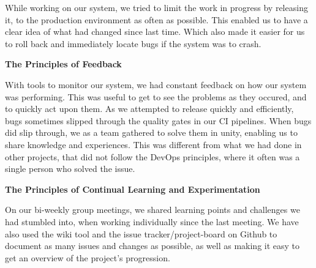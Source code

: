 While working on our system, we tried to limit the work in progress by releasing it, to the production environment as often as possible. 
This enabled us to have a clear idea of what had changed since last time. 
Which also made it easier for us to roll back and immediately locate bugs if the system was to crash.

\textbf{The Principles of Feedback}

With tools to monitor our system, we had constant feedback on how our system was performing. 
This was useful to get to see the problems as they occured, and to quickly act upon them. 
As we attempted to release quickly and efficiently, bugs sometimes slipped through the quality gates in our CI pipelines. 
When bugs did slip through, we as a team gathered to solve them in unity, enabling us to share knowledge and experiences. 
This was different from what we had done in other projects, that did not follow the DevOps principles, where it often was a single person who solved the issue.

\textbf{The Principles of Continual Learning and Experimentation}

On our bi-weekly group meetings, we shared learning points and challenges we had stumbled into, when working individually since the last meeting.
 We have also used the wiki tool and the issue tracker/project-board on Github to document as many issues and changes as possible, 
 as well as making it easy to get an overview of the project's progression.

